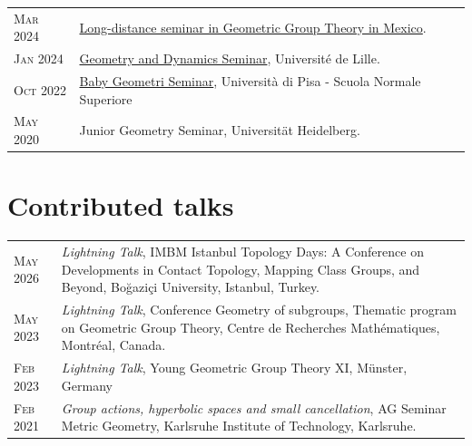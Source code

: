 \documentclass[a4paper,10pt]{article} %
\begin{document}
\begin{longtable}{>{\raggedleft\arraybackslash}p{2cm}p{13cm}}
    \textsc{Mar 2024} & \href{https://sites.google.com/view/seminar-ggt-mexico/}{Long-distance seminar in Geometric Group Theory in Mexico}.\\ %

    \textsc{Jan 2024} & \href{https://math.univ-lille.fr/agenda/seminaires/seminaire-geometrie-dynamique}{Geometry and Dynamics Seminar}, Université de Lille. \\ %

    \textsc{Oct 2022} & \href{https://sites.google.com/view/babygeometri/edizioni-passate/20222023?authuser=0}{Baby Geometri Seminar}, Università di Pisa - Scuola Normale Superiore\\ %

    \textsc{May 2020} & \textcolor{linkcolour}{Junior Geometry Seminar}, Universität Heidelberg.\\ %

\end{longtable}

\section{Contributed talks}

\begin{longtable}{>{\raggedleft\arraybackslash}p{2cm}p{13cm}}

    \textsc{May 2026} & \emph{Lightning Talk}, IMBM Istanbul Topology Days:
A Conference on Developments in Contact Topology, Mapping Class Groups, and Beyond, Bo\u{g}azi\c{c}i University, Istanbul, Turkey. \\
    
    \textsc{May 2023} & \emph{Lightning Talk}, Conference Geometry of subgroups, Thematic program on Geometric Group Theory, Centre de Recherches Mathématiques, Montréal, Canada. \\

    \textsc{Feb 2023} & \emph{Lightning Talk}, Young Geometric Group Theory XI, Münster, Germany\\



    \textsc{Feb 2021} & \emph{Group actions, hyperbolic spaces and small cancellation}, AG Seminar Metric Geometry, Karlsruhe Institute of Technology, Karlsruhe.\\
\end{longtable}
\end{document}
